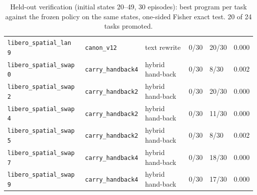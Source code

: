 \begin{table}[h]
\begin{tabular}{llllll}
\texttt{libero\_spatial\_lan 9} & \texttt{canon\_v12} & text rewrite & 0/30 & 20/30 & 0.000 \\
\texttt{libero\_spatial\_swap 0} & \texttt{carry\_handback4} & hybrid hand-back & 0/30 & 8/30 & 0.002 \\
\texttt{libero\_spatial\_swap 2} & \texttt{carry\_handback2} & hybrid hand-back & 0/30 & 20/30 & 0.000 \\
\texttt{libero\_spatial\_swap 4} & \texttt{carry\_handback2} & hybrid hand-back & 0/30 & 11/30 & 0.000 \\
\texttt{libero\_spatial\_swap 5} & \texttt{carry\_handback2} & hybrid hand-back & 0/30 & 8/30 & 0.002 \\
\texttt{libero\_spatial\_swap 7} & \texttt{carry\_handback4} & hybrid hand-back & 0/30 & 18/30 & 0.000 \\
\texttt{libero\_spatial\_swap 9} & \texttt{carry\_handback4} & hybrid hand-back & 0/30 & 17/30 & 0.000 \\
\bottomrule
\end{tabular}
\caption{Held-out verification (initial states 20--49, 30 episodes): best program per task against the frozen policy on the same states, one-sided Fisher exact test. 20 of 24 tasks promoted.}
\end{table}
